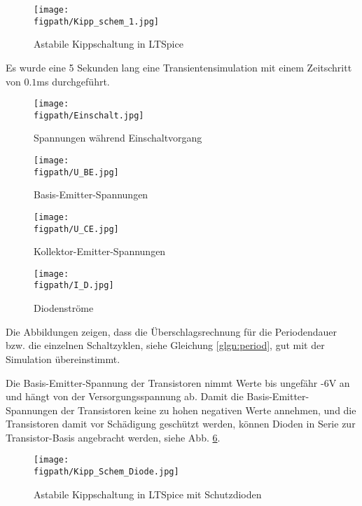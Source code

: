 \begin{figure}[H]
    \centering
    \texttt{[image: \\figpath/Kipp\_schem\_1.jpg]}
    \caption{Astabile Kippschaltung in LTSpice}
    \label{fig_Kap3_03:LTSpice_Schem_1}
\end{figure}

Es wurde eine 5 Sekunden lang eine Transientensimulation mit einem Zeitschritt von $0.1$ms durchgeführt.

\begin{figure}[H]
	\centering \small
	\texttt{[image: \\figpath/Einschalt.jpg]}
	\caption{Spannungen während Einschaltvorgang}
	\label{fig_Kap3_04:Einschalt}
\end{figure}

\begin{figure}[H]
	\centering \small
	\texttt{[image: \\figpath/U\_BE.jpg]}
	\caption{Basis-Emitter-Spannungen}
	\label{fig_Kap3_05:U_BE}
\end{figure}

\begin{figure}[H]
	\centering \small
	\texttt{[image: \\figpath/U\_CE.jpg]}
	\caption{Kollektor-Emitter-Spannungen}
	\label{fig_Kap3_06:U_CE}
\end{figure}

\begin{figure}[H]
	\centering \small
	\texttt{[image: \\figpath/I\_D.jpg]}
	\caption{Diodenströme}
	\label{fig_Kap3_07:I_D}
\end{figure}

Die Abbildungen zeigen, dass die Überschlagsrechnung für die Periodendauer bzw. die einzelnen Schaltzyklen, siehe Gleichung \ref{glgn:period}, gut mit der Simulation übereinstimmt.

Die Basis-Emitter-Spannung der Transistoren nimmt Werte bis ungefähr -6V an und hängt von der Versorgungsspannung ab. Damit die Basis-Emitter-Spannungen der Transistoren keine zu hohen negativen Werte annehmen, und die Transistoren damit vor Schädigung geschützt werden, können Dioden in Serie zur Transistor-Basis angebracht werden, siehe Abb. \ref{fig_Kap3_08:LTSpice_Schem_2}.

\begin{figure}[H]
    \centering
    \texttt{[image: \\figpath/Kipp\_Schem\_Diode.jpg]}
    \caption{Astabile Kippschaltung in LTSpice mit Schutzdioden}
    \label{fig_Kap3_08:LTSpice_Schem_2}
\end{figure}

